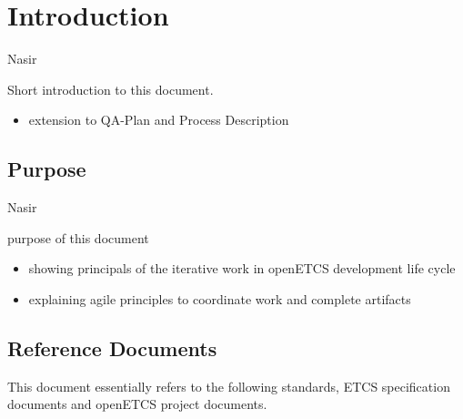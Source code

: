\documentclass{template/openetcs_report}
\begin{document}

\mainmatter

\chapter{Introduction}
\label{sec:introduction}

Nasir

Short introduction to this document.

\begin{itemize}
\item extension to QA-Plan and Process Description
\end{itemize}

\section{Purpose}
\label{sec:purpose}

Nasir

purpose of this document

\begin{itemize}
\item showing principals of the iterative work in openETCS development life cycle 
\item explaining agile principles to coordinate work and complete artifacts
\end{itemize}







\section{Reference Documents}
\label{sec:refdoc}

This document essentially refers to the following standards, ETCS specification documents and openETCS project documents.
\end{document}
